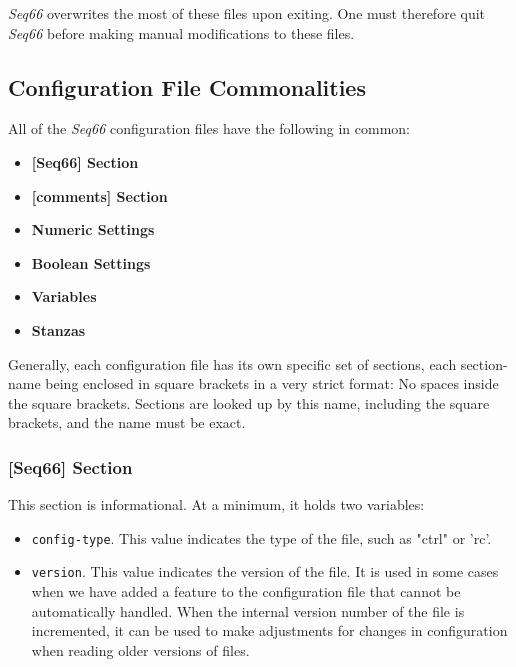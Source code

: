    \textsl{Seq66} overwrites the most of these files upon exiting.
   One must therefore quit \textsl{Seq66} before making
   manual modifications to these files.

\subsection{Configuration File Commonalities}
\label{subsec:configuration_file_commonalities}

   All of the \textsl{Seq66} configuration files have the following in common:

   \begin{itemize}
      \item \textbf{[Seq66] Section}
      \item \textbf{[comments] Section}
      \item \textbf{Numeric Settings}
      \item \textbf{Boolean Settings}
      \item \textbf{Variables}
      \item \textbf{Stanzas}
   \end{itemize}

   Generally, each configuration file has its own specific set
   of sections, each section-name being enclosed in square brackets in a very
   strict format:  No spaces inside the square brackets.  Sections are looked up
   by this name, including the square brackets, and the name must be exact.

\subsubsection{[Seq66] Section}
\label{subsec:configuration_common_seq66_section}

   This section is informational.  At a minimum, it holds two
   variables:

   \begin{itemize}
      \item \texttt{config-type}.  This value indicates the type of the file,
      such as "ctrl" or 'rc'.
      \item \texttt{version}.  This value indicates the version of the file.
      It is used in some cases when we have added a feature to the
      configuration file that cannot be automatically handled.
      When the internal version number of the file is incremented,
      it can be used to make adjustments for changes in configuration when
      reading older versions of files.
   \end{itemize}

